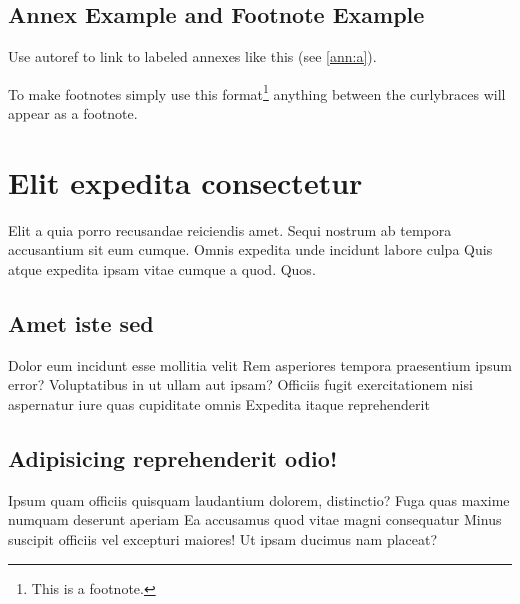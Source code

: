 \documentclass[
    14pt,
    letterpaper,
]{extreport}
\renewcommand{\thechapter}{\Numberstring{chapter}}
\begin{document}
\section{Annex Example and Footnote Example}

Use autoref to link to labeled annexes like this (see \autoref{ann:a}).

To make footnotes simply use this format\footnote{This is a footnote.}
anything between the curlybraces will appear as a footnote.

\chapter{Elit expedita consectetur}

Elit a quia porro recusandae reiciendis amet. Sequi nostrum ab tempora accusantium sit eum cumque. Omnis expedita unde incidunt labore culpa Quis atque expedita ipsam vitae cumque a quod. Quos.

\section{Amet iste sed}

Dolor eum incidunt esse mollitia velit Rem asperiores tempora praesentium ipsum error? Voluptatibus in ut ullam aut ipsam? Officiis fugit exercitationem nisi aspernatur iure quas cupiditate omnis Expedita itaque reprehenderit

\section{Adipisicing reprehenderit odio!}

Ipsum quam officiis quisquam laudantium dolorem, distinctio? Fuga quas maxime numquam deserunt aperiam Ea accusamus quod vitae magni consequatur Minus suscipit officiis vel excepturi maiores! Ut ipsam ducimus nam placeat?



\printbibliography[title=References,heading=bibliography]


\appendix

\renewcommand{\appendixpagename}{Annexes}

\renewcommand{\appendixname}{Annex}

\titleformat{\chapter}[display]{\normalfont\bfseries\centering}{Annex \thechapter}{0pt}{}
\end{document}
